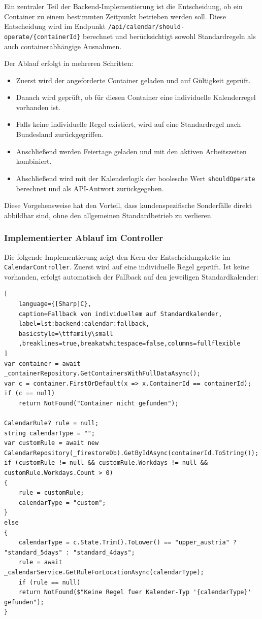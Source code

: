Ein zentraler Teil der Backend-Implementierung ist die Entscheidung, ob ein Container zu einem bestimmten Zeitpunkt betrieben werden soll. Diese Entscheidung wird im Endpunkt \texttt{/api/calendar/should-operate/\{containerId\}} berechnet und berücksichtigt sowohl Standardregeln als auch containerabhängige Ausnahmen.

Der Ablauf erfolgt in mehreren Schritten:

\begin{itemize}
    \item Zuerst wird der angeforderte Container geladen und auf Gültigkeit geprüft.
    \item Danach wird geprüft, ob für diesen Container eine individuelle Kalenderregel vorhanden ist.
    \item Falls keine individuelle Regel existiert, wird auf eine Standardregel nach Bundesland zurückgegriffen.
    \item Anschließend werden Feiertage geladen und mit den aktiven Arbeitszeiten kombiniert.
    \item Abschließend wird mit der Kalenderlogik der boolesche Wert \texttt{shouldOperate} berechnet und als API-Antwort zurückgegeben.
\end{itemize}

Diese Vorgehensweise hat den Vorteil, dass kundenspezifische Sonderfälle direkt abbildbar sind, ohne den allgemeinen Standardbetrieb zu verlieren.

\subsubsection{Implementierter Ablauf im Controller}

Die folgende Implementierung zeigt den Kern der Entscheidungskette im \texttt{CalendarController}. Zuerst wird auf eine individuelle Regel geprüft. Ist keine vorhanden, erfolgt automatisch der Fallback auf den jeweiligen Standardkalender:

\begin{lstlisting}[
    language={[Sharp]C},
    caption=Fallback von individuellem auf Standardkalender,
    label=lst:backend:calendar:fallback,
    basicstyle=\ttfamily\small
    ,breaklines=true,breakatwhitespace=false,columns=fullflexible
]
var container = await _containerRepository.GetContainersWithFullDataAsync();
var c = container.FirstOrDefault(x => x.ContainerId == containerId);
if (c == null)
    return NotFound("Container nicht gefunden");

CalendarRule? rule = null;
string calendarType = "";
var customRule = await new CalendarRepository(_firestoreDb).GetByIdAsync(containerId.ToString());
if (customRule != null && customRule.Workdays != null && customRule.Workdays.Count > 0)
{
    rule = customRule;
    calendarType = "custom";
}
else
{
    calendarType = c.State.Trim().ToLower() == "upper_austria" ? "standard_5days" : "standard_4days";
    rule = await _calendarService.GetRuleForLocationAsync(calendarType);
    if (rule == null)
    return NotFound($"Keine Regel fuer Kalender-Typ '{calendarType}' gefunden");
}
\end{lstlisting}

